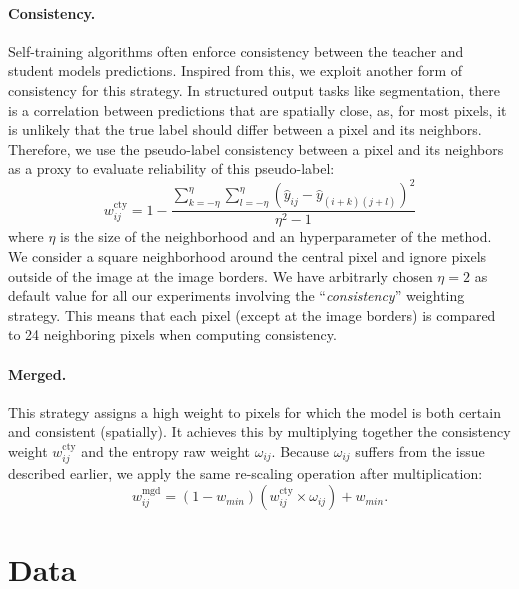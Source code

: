 \paragraph{Consistency.} Self-training algorithms often enforce consistency between the teacher and student models predictions. Inspired from this, we exploit another form of consistency for this strategy. In structured output tasks like segmentation, there is a correlation between predictions that are spatially close, as, for most pixels, it is unlikely that the true label should differ between a pixel and its neighbors. Therefore, we use the pseudo-label consistency between a pixel and its neighbors as a proxy to evaluate reliability of this pseudo-label: %
\begin{equation}
w^{\text{cty}}_{ij} = 1 - \dfrac{\sum_{k=-\eta}^{\eta} \sum_{l=-\eta}^{\eta} (\hat{y}_{ij}- \hat{y}_{(i+k)(j+l)})^2}{\eta^2 - 1}
\end{equation}
where $\eta$ is the size of the neighborhood and an hyperparameter of the method. We consider a square neighborhood around the central pixel and ignore pixels outside of the image at the image borders. We have arbitrarly chosen $\eta = 2$ as default value for all our experiments involving the ``\textit{consistency}'' weighting strategy. This means that each pixel (except at the image borders) is compared to 24 neighboring pixels when computing consistency. 

\paragraph{Merged.} This strategy assigns a high weight to pixels for which the model is both certain and consistent (spatially). It achieves this by multiplying together the consistency weight $w^{\text{cty}}_{ij}$ and the entropy raw weight $\omega_{ij}$. Because $\omega_{ij}$ suffers from the issue described earlier, we apply the same re-scaling operation after multiplication:
\begin{equation}
w^{\text{mgd}}_{ij} = (1 - w_{min}) \left(w^{\text{cty}}_{ij} \times \omega_{ij}\right) + w_{min}.
\end{equation}

\section{Data}
\label{sec:strain:data}

